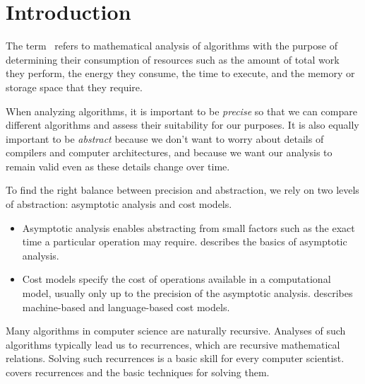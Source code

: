 \chapter{Introduction}
\label{ch:analysis::introduction}

\begin{cluster}
\label{grp:grm:analysis::introduction::algorithm-analysis}

\begin{gram}
\label{grm:analysis::introduction::algorithm-analysis}
The term~ refers to mathematical analysis of
algorithms with the purpose of determining their consumption of
resources such as the amount of total work they perform, the energy
they consume, the time to execute, and the memory or storage space
that they require.

When analyzing algorithms, it is important to be \emph{precise} so
that we can compare different algorithms and assess their suitability for
our purposes.
It is also equally important to be \emph{abstract} because we don't
want to worry about details of compilers and computer architectures,
and because we want our analysis to remain valid even as these details
change over time.

To find the right balance between precision and abstraction, we rely
on two levels of abstraction: asymptotic analysis and cost models.
\begin{itemize}
\item Asymptotic analysis enables abstracting from small factors such as the
exact time a particular operation may require. 
 describes the basics of asymptotic
analysis.

\item Cost models specify the cost of operations available in a
  computational model, usually only up to the precision of the
  asymptotic analysis.   describes
  machine-based and language-based cost models.
\end{itemize}

Many algorithms in computer science are naturally recursive.  
Analyses of such algorithms typically lead us to recurrences, which
are recursive mathematical relations.
Solving such recurrences is a basic skill for every computer
scientist.
 covers recurrences and the basic
techniques for solving them.

\end{gram}
\end{cluster}


